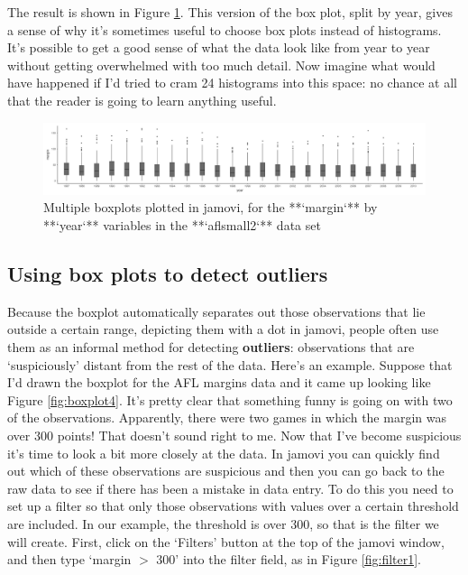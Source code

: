 \documentclass[
]{book}
\begin{document}
The result is shown in Figure \ref{fig:boxplot3}. This version of the box plot, split by year, gives a sense of why it's sometimes useful to choose box plots instead of histograms. It's possible to get a good sense of what the data look like from year to year without getting overwhelmed with too much detail. Now imagine what would have happened if I'd tried to cram 24 histograms into this space: no chance at all that the reader is going to learn anything useful.

\begin{figure}

{\centering \includegraphics[width=1\linewidth]{img/graphics/boxplot3} 

}

\caption{Multiple boxplots plotted in jamovi, for the **`margin`** by **`year`** variables in the **`aflsmall2`** data set}\label{fig:boxplot3}
\end{figure}

\hypertarget{boxplotoutliers}{%
\subsection{Using box plots to detect outliers}\label{boxplotoutliers}}

Because the boxplot automatically separates out those observations that lie outside a certain range, depicting them with a dot in jamovi, people often use them as an informal method for detecting {\textbf{outliers}}: observations that are `suspiciously' distant from the rest of the data. Here's an example. Suppose that I'd drawn the boxplot for the AFL margins data and it came up looking like Figure \ref{fig:boxplot4}. It's pretty clear that something funny is going on with two of the observations. Apparently, there were two games in which the margin was over 300 points! That doesn't sound right to me. Now that I've become suspicious it's time to look a bit more closely at the data. In jamovi you can quickly find out which of these observations are suspicious and then you can go back to the raw data to see if there has been a mistake in data entry. To do this you need to set up a filter so that only those observations with values over a certain threshold are included. In our example, the threshold is over 300, so that is the filter we will create. First, click on the `Filters' button at the top of the jamovi window, and then type `margin \(>\) 300' into the filter field, as in Figure \ref{fig:filter1}.
\end{document}
